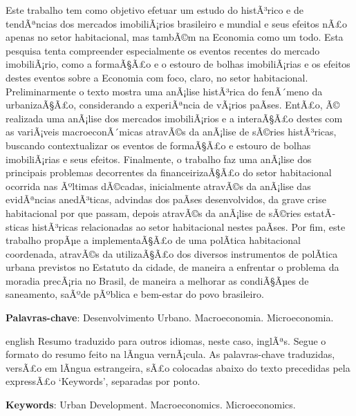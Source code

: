 \documentclass[
	12pt,				%
	oneside,			%
	a4paper,			%
	chapter=TITLE,		%
	section=TITLE,		%
	english,			%
	brazil				%
	]{abntex2}
\begin{document}
\setlength{\absparsep}{18pt} %
\begin{resumo}
	\SingleSpacing
  Este trabalho tem como objetivo efetuar um estudo do histÃ³rico e de tendÃªncias
dos mercados imobiliÃ¡rios brasileiro e mundial e seus efeitos nÃ£o apenas no
setor habitacional, mas tambÃ©m na Economia como um todo. Esta pesquisa tenta
compreender especialmente os eventos recentes do mercado imobiliÃ¡rio, como a
formaÃ§Ã£o e o estouro de bolhas imobiliÃ¡rias e os efeitos destes eventos sobre a
Economia com foco, claro, no setor habitacional. Preliminarmente o texto mostra
uma anÃ¡lise histÃ³rica do fenÃ´meno da urbanizaÃ§Ã£o, considerando a experiÃªncia de
vÃ¡rios paÃ­ses. EntÃ£o, Ã© realizada uma anÃ¡lise dos mercados imobiliÃ¡rios e a
interaÃ§Ã£o destes com as variÃ¡veis macroeconÃ´micas atravÃ©s da anÃ¡lise de sÃ©ries
histÃ³ricas, buscando contextualizar os eventos de formaÃ§Ã£o e estouro de bolhas
imobiliÃ¡rias e seus efeitos. Finalmente, o trabalho faz uma anÃ¡lise dos
principais problemas decorrentes da financeirizaÃ§Ã£o do setor habitacional
ocorrida nas Ãºltimas dÃ©cadas, inicialmente atravÃ©s da anÃ¡lise das evidÃªncias
anedÃ³ticas, advindas dos paÃ­ses desenvolvidos, da grave crise habitacional por
que passam, depois atravÃ©s da anÃ¡lise de sÃ©ries estatÃ­sticas histÃ³ricas
relacionadas ao setor habitacional nestes paÃ­ses. Por fim, este trabalho propÃµe
a implementaÃ§Ã£o de uma polÃ­tica habitacional coordenada, atravÃ©s da utilizaÃ§Ã£o
dos diversos instrumentos de polÃ­tica urbana previstos no Estatuto da cidade, de
maneira a enfrentar o problema da moradia precÃ¡ria no Brasil, de maneira a
melhorar as condiÃ§Ãµes de saneamento, saÃºde pÃºblica e bem-estar do povo
brasileiro. 
  
  \textbf{Palavras-chave}: 
    Desenvolvimento Urbano.
    Macroeconomia.
    Microeconomia.
  \end{resumo}
\begin{resumo}[Abstract]
	\SingleSpacing
	\begin{otherlanguage*}{english}
		Resumo traduzido para outros idiomas, neste caso, inglÃªs. Segue o formato do resumo feito na lÃ­ngua vernÃ¡cula. As palavras-chave traduzidas, versÃ£o em lÃ­ngua estrangeira, sÃ£o colocadas abaixo do texto precedidas pela expressÃ£o `Keywords', separadas por ponto.
		
		\textbf{Keywords}:
	      Urban Development.
        Macroeconomics.
        Microeconomics.
    	\end{otherlanguage*}
\end{resumo}
\end{document}
